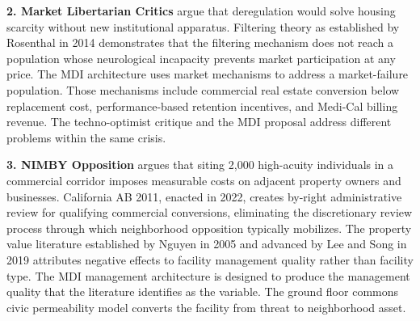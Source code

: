 \documentclass[12pt, letterpaper]{article}
\begin{document}
\textbf{2. Market Libertarian Critics} argue that deregulation would solve housing scarcity without new institutional apparatus. Filtering theory as established by Rosenthal in 2014 demonstrates that the filtering mechanism does not reach a population whose neurological incapacity prevents market participation at any price. The MDI architecture uses market mechanisms to address a market-failure population. Those mechanisms include commercial real estate conversion below replacement cost, performance-based retention incentives, and Medi-Cal billing revenue. The techno-optimist critique and the MDI proposal address different problems within the same crisis.

\textbf{3. NIMBY Opposition} argues that siting 2,000 high-acuity individuals in a commercial corridor imposes measurable costs on adjacent property owners and businesses. California AB 2011, enacted in 2022, creates by-right administrative review for qualifying commercial conversions, eliminating the discretionary review process through which neighborhood opposition typically mobilizes. The property value literature established by Nguyen in 2005 and advanced by Lee and Song in 2019 attributes negative effects to facility management quality rather than facility type. The MDI management architecture is designed to produce the management quality that the literature identifies as the variable. The ground floor commons civic permeability model converts the facility from threat to neighborhood asset.
\end{document}
